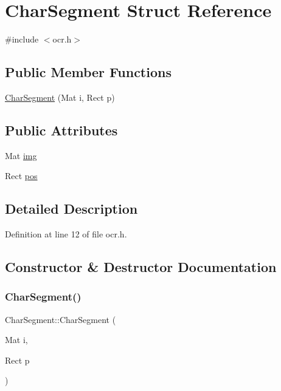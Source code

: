 \hypertarget{struct_char_segment}{}\section{Char\+Segment Struct Reference}
\label{struct_char_segment}


{\ttfamily \#include $<$ocr.\+h$>$}

\subsection*{Public Member Functions}
\begin{DoxyCompactItemize}
\item 
\mbox{\hyperlink{struct_char_segment_a0a2d7c449d5b885a095f7dd66f3b32f8}{Char\+Segment}} (Mat i, Rect p)
\end{DoxyCompactItemize}
\subsection*{Public Attributes}
\begin{DoxyCompactItemize}
\item 
Mat \mbox{\hyperlink{struct_char_segment_a9a25b272291af7bdf3f46d3fe50430bb}{img}}
\item 
Rect \mbox{\hyperlink{struct_char_segment_a1ed00d0e9995381fd74e646cedff2516}{pos}}
\end{DoxyCompactItemize}


\subsection{Detailed Description}


Definition at line 12 of file ocr.\+h.



\subsection{Constructor \& Destructor Documentation}
\mbox{\label{struct_char_segment_a0a2d7c449d5b885a095f7dd66f3b32f8}} 
\subsubsection{\texorpdfstring{Char\+Segment()}{CharSegment()}}
{\footnotesize\ttfamily Char\+Segment\+::\+Char\+Segment (\begin{DoxyParamCaption}\item[{Mat}]{i,  }\item[{Rect}]{p }\end{DoxyParamCaption})\hspace{0.3cm}{\ttfamily [inline]}}



